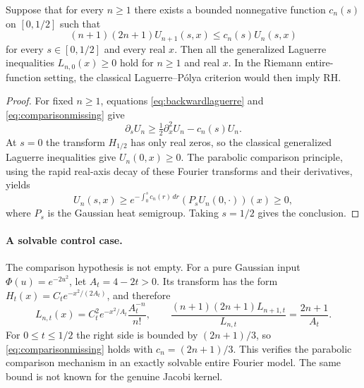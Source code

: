 \begin{proposition}
\label{prop:heatsufficient}
Suppose that for every $n\ge1$ there exists
a bounded nonnegative function $c_n(s)$ on
$[0,1/2]$ such that
\begin{equation}
(n+1)(2n+1)U_{n+1}(s,x)
\le c_n(s)U_n(s,x)
\label{eq:comparisonmissing}
\end{equation}
for every $s\in[0,1/2]$ and every real $x$.
Then all the generalized Laguerre inequalities
$L_{n,0}(x)\ge0$ hold for $n\ge1$ and real $x$.
In the Riemann entire-function setting,
the classical Laguerre--P\'olya criterion would
then imply RH.
\end{proposition}
\begin{proof}
For fixed $n\ge1$, equations
\eqref{eq:backwardlaguerre} and
\eqref{eq:comparisonmissing} give
\[
\partial_sU_n\ge
\tfrac12\partial_x^2U_n-c_n(s)U_n.
\]
At $s=0$ the transform $H_{1/2}$ has only
real zeros, so the classical generalized
Laguerre inequalities give $U_n(0,x)\ge0$.
The parabolic comparison principle, using
the rapid real-axis decay of these
Fourier transforms and their derivatives,
yields
\[
U_n(s,x)\ge
e^{-\int_0^s c_n(r)\,dr}
(P_sU_n(0,\cdot))(x)\ge0,
\]
where $P_s$ is the Gaussian heat semigroup.
Taking $s=1/2$ gives the conclusion.
\end{proof}

\paragraph{A solvable control case.}
The comparison hypothesis is not empty.
For a pure Gaussian input $\Phi(u)=e^{-2u^2}$,
let $A_t=4-2t>0$. Its transform has the form
$H_t(x)=C_t e^{-x^2/(2A_t)}$, and therefore
\[
L_{n,t}(x)=C_t^2e^{-x^2/A_t}
\frac{A_t^{-n}}{n!},\qquad
\frac{(n+1)(2n+1)L_{n+1,t}}{L_{n,t}}
=\frac{2n+1}{A_t}.
\]
For $0\le t\le1/2$ the right side
is bounded by $(2n+1)/3$,
so \eqref{eq:comparisonmissing} holds with
$c_n=(2n+1)/3$. This verifies
the parabolic comparison mechanism in
an exactly solvable entire Fourier model.
The same bound is not known for the
genuine Jacobi kernel.

